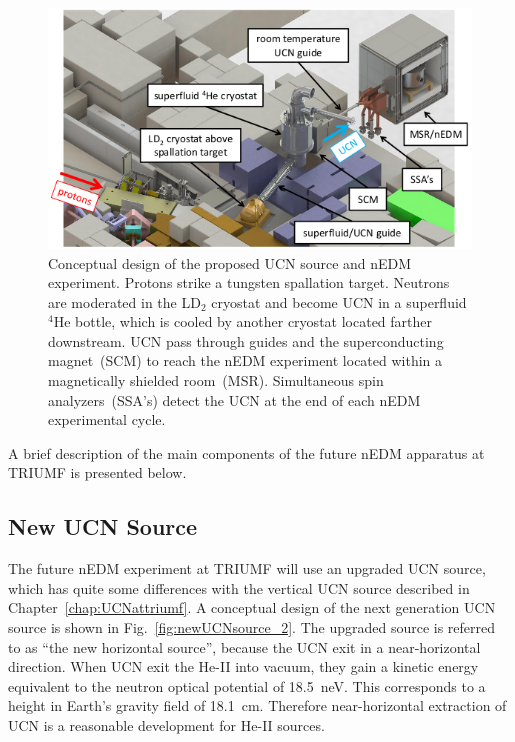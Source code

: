 \begin{figure}[h!]
  \centering
  \includegraphics[width=1.0\textwidth]{edmtriumf.png}
  \caption[Conceptual design of TUCAN's future nEDM
  facility]{Conceptual design of the proposed UCN source and nEDM
    experiment. Protons strike a tungsten spallation target. Neutrons
    are moderated in the LD$_2$ cryostat and become UCN in a
    superfluid $^4$He bottle, which is cooled by another cryostat
    located farther downstream. UCN pass through guides and the
    superconducting magnet~(SCM) to reach the nEDM experiment located
    within a magnetically shielded room~(MSR). Simultaneous spin
    analyzers~(SSA’s) detect the UCN at the end of each nEDM
    experimental cycle.  }
  \label{fig:triumfEDM}
\end{figure}

A brief description of the main components of the future nEDM apparatus
at TRIUMF is presented below.

\subsection{New UCN Source\label{sec:newUCNsource}}


The future nEDM experiment at TRIUMF will use an upgraded UCN source,
which has quite some differences with the vertical UCN source
described in Chapter~\ref{chap:UCNattriumf}. A conceptual design of
the next generation UCN source is shown in
Fig.~\ref{fig:newUCNsource_2}. The upgraded source is referred to as
``the new horizontal source'', because the UCN exit in a
near-horizontal direction. When UCN exit the He-II into vacuum, they
gain a kinetic energy equivalent to the neutron optical potential of
18.5~neV. This corresponds to a height in Earth’s gravity field of
18.1~cm. Therefore near-horizontal extraction of UCN is a reasonable
development for He-II sources.


